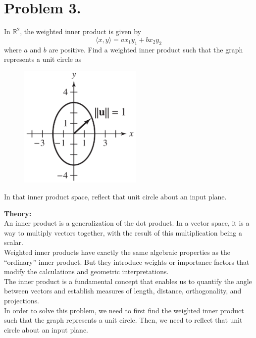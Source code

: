\clearpage
\section{ Problem 3.}
In $\mathbb{R}^2$, the weighted inner product is given by
$$ \langle x, y \rangle = ax_1y_1 + bx_2y_2 $$
where $a$ and $b$ are positive. Find a weighted inner product such that
the graph represents a unit circle as
\begin{figure}[H]
    \centering
    \includegraphics[width=6cm]{graphics/3_0.png}
\end{figure}
In that inner product space, reflect that unit circle about an input
plane.

\vspace*{1cm}

\textbf{Theory:}\\[6pt]
An inner product is a generalization of the dot product. In a vector space, it is a way to multiply vectors together, with the result of this multiplication being a scalar.\\[6pt]
Weighted inner products have exactly the same algebraic properties
as the “ordinary” inner product. But they introduce weights or importance factors that modify the calculations and geometric interpretations. \\[6pt]

The inner product is a fundamental concept that enables us to quantify the angle between vectors and establish measures of length, distance, orthogonality, and projections. \\[6pt]

In order to solve this problem, we need to first find the weighted inner product such that the graph represents a unit circle. Then, we need to reflect that unit circle about an input plane.\\[6pt]

\vspace*{1cm}


